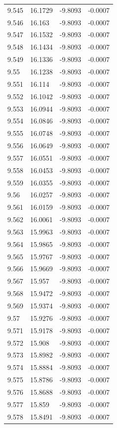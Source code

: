 \begin{tabular}{llll}
9.545 & 16.1729 & -9.8093 & -0.0007 \\
9.546 & 16.163 & -9.8093 & -0.0007 \\
9.547 & 16.1532 & -9.8093 & -0.0007 \\
9.548 & 16.1434 & -9.8093 & -0.0007 \\
9.549 & 16.1336 & -9.8093 & -0.0007 \\
9.55 & 16.1238 & -9.8093 & -0.0007 \\
9.551 & 16.114 & -9.8093 & -0.0007 \\
9.552 & 16.1042 & -9.8093 & -0.0007 \\
9.553 & 16.0944 & -9.8093 & -0.0007 \\
9.554 & 16.0846 & -9.8093 & -0.0007 \\
9.555 & 16.0748 & -9.8093 & -0.0007 \\
9.556 & 16.0649 & -9.8093 & -0.0007 \\
9.557 & 16.0551 & -9.8093 & -0.0007 \\
9.558 & 16.0453 & -9.8093 & -0.0007 \\
9.559 & 16.0355 & -9.8093 & -0.0007 \\
9.56 & 16.0257 & -9.8093 & -0.0007 \\
9.561 & 16.0159 & -9.8093 & -0.0007 \\
9.562 & 16.0061 & -9.8093 & -0.0007 \\
9.563 & 15.9963 & -9.8093 & -0.0007 \\
9.564 & 15.9865 & -9.8093 & -0.0007 \\
9.565 & 15.9767 & -9.8093 & -0.0007 \\
9.566 & 15.9669 & -9.8093 & -0.0007 \\
9.567 & 15.957 & -9.8093 & -0.0007 \\
9.568 & 15.9472 & -9.8093 & -0.0007 \\
9.569 & 15.9374 & -9.8093 & -0.0007 \\
9.57 & 15.9276 & -9.8093 & -0.0007 \\
9.571 & 15.9178 & -9.8093 & -0.0007 \\
9.572 & 15.908 & -9.8093 & -0.0007 \\
9.573 & 15.8982 & -9.8093 & -0.0007 \\
9.574 & 15.8884 & -9.8093 & -0.0007 \\
9.575 & 15.8786 & -9.8093 & -0.0007 \\
9.576 & 15.8688 & -9.8093 & -0.0007 \\
9.577 & 15.859 & -9.8093 & -0.0007 \\
9.578 & 15.8491 & -9.8093 & -0.0007 \\

\end{tabular}
